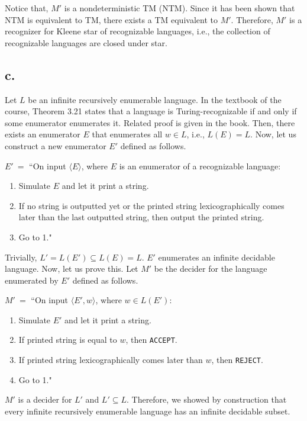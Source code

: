 \documentclass[12pt]{article}
\begin{document}
Notice that, $M'$ is a nondeterministic TM (NTM). Since it has been shown that NTM is equivalent to TM, there exists a TM equivalent to $M'$. Therefore, $M'$ is a recognizer for Kleene star of recognizable languages, i.e., the collection of recognizable languages are closed under star.

\subsection*{c.} 

Let $L$ be an infinite recursively enumerable language. In the textbook of the course, Theorem 3.21 states that a language is Turing-recognizable if and only if some enumerator enumerates it. Related proof is given in the book. Then, there exists an enumerator $E$ that enumerates all $w \in L$, i.e., $L(E) = L$. Now, let us construct a new enumerator $E'$ defined as follows.

$E' \ =$ ``On input $\langle E \rangle$, where $E$ is an enumerator of a recognizable language:
\begin{enumerate}[leftmargin=2.50cm]
	\item Simulate $E$ and let it print a string.
	\item If no string is outputted yet or the printed string lexicographically comes later than the last outputted string, then output the printed string.
	\item Go to 1."
\end{enumerate}

Trivially, $L' = L(E') \subseteq L(E) = L$. $E'$ enumerates an infinite decidable language. Now, let us prove this. Let $M'$ be the decider for the language enumerated by $E'$ defined as follows.

$M' \ =$ ``On input $\langle E', w \rangle$, where $w \in L(E')$:
\begin{enumerate}[leftmargin=2.50cm]
	\item Simulate $E'$ and let it print a string.
	\item If printed string is equal to $w$, then \texttt{ACCEPT}.
	\item If printed string lexicographically comes later than $w$, then \texttt{REJECT}.
	\item Go to 1."
\end{enumerate}

$M'$ is a decider for $L'$ and $L' \subseteq L$. Therefore, we showed by construction that every infinite recursively enumerable language has an infinite decidable subset.
\end{document}
